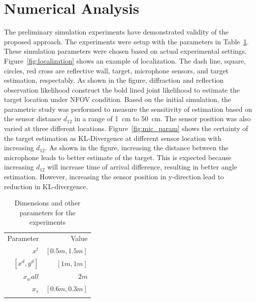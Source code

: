 \documentclass[letterpaper, 10 pt, conference]{ieeeconf}  %
\begin{document}

\section{Numerical Analysis}
The preliminary simulation experiments have demonstrated validity of the proposed approach. The experiments were setup with the parameters in Table~\ref{tab:experimental_parameter}. These simulation parameters were chosen based on actual experimental settings.
Figure~\ref{fig:localization} shows an example of localization. The dash line, square, circles, red cross are reflective wall, target, microphone sensors, and target estimation, respectably. As shown in the figure, diffraction and reflection observation likelihood construct the bold lined joint likelihood to estimate the target location under NFOV condition.
Based on the initial simulation, the parametric study was performed to measure the sensitivity of estimation based on the sensor distance $d_{12}$ in a range of 1~cm to 50~cm. The sensor position was also varied at three different locations. Figure~\ref{fig:mic_param} shows the certainty of the target estimation as KL-Divergence at different sensor location with increasing $d_{12}$. As shown in the figure, increasing the distance between the microphone leads to better estimate of the target. This is expected because increasing $d_{12}$ will increase time of arrival difference, resulting in better angle estimation. However, increasing the sensor position in y-direction lead to reduction in KL-divergence.



\begin{table}[h]
	\centering \caption{Dimensions and other parameters for the experiments}
	\label{tab:experimental_parameter}
	\begin{tabular}{r|r}
		\hline\noalign{\smallskip}
		Parameter & Value \\
 		\noalign{\smallskip}\hline\noalign{\smallskip}
 		$x^t$ & $[0.5m, 1.5m]$ \\
 		$[x^d, y^d]$ & $[1m, 1m]$ \\
 		$x_wall$ & $2m$\\
 		$x_s$ & $[0.6m,0.3m]$\\
		\noalign{\smallskip}\hline\noalign{\smallskip}
 	\end{tabular}
\end{table}
\end{document}
